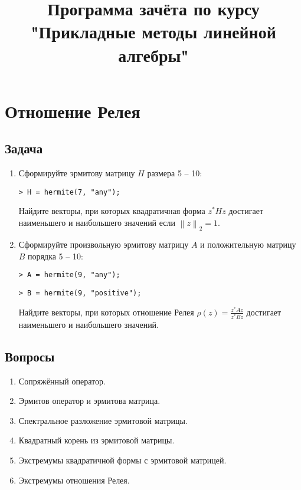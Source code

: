 \documentclass[a4paper,12pt]{article}
\newenvironment{Matlab}{\par \vspace{0.2cm}}{\vspace{0.2cm} \par}
\newcommand{\Mcommand}[1]{\noindent \texttt{> #1} \par}
\newcommand{\matlab}[1]{\begin{Matlab} \Mcommand{#1} \end{Matlab}}
\newcommand{\snorm}[1]{\left\| #1 \right\|_2}
\begin{document}
\title{Программа зачёта по курсу \\ "Прикладные методы линейной алгебры"}
\date{}
\author{}
\maketitle

\section{Отношение Релея}

\subsection{Задача}

\begin{enumerate}
    \item Сформируйте эрмитову матрицу $H$ размера 5 -- 10:
          \matlab{H = hermite(7, "any");}
          Найдите векторы, при которых квадратичная форма $z^* H z$ достигает наименьшего и наибольшего значений если $\snorm{z}=1$.

    \item Сформируйте произвольную эрмитову матрицу $A$ и положительную матрицу $B$ порядка 5 -- 10:
          \begin{Matlab}
              \Mcommand{A = hermite(9, "any");}
              \Mcommand{B = hermite(9, "positive");}
          \end{Matlab}
          Найдите векторы, при которых отношение Релея $\rho(z) = \frac{z^* A z}{z^* B z}$ достигает наименьшего и наибольшего значений.
\end{enumerate}

\subsection{Вопросы}

\begin{enumerate}
    \item Сопряжённый оператор.
    \item Эрмитов оператор и эрмитова матрица.
    \item Спектральное разложение эрмитовой матрицы.
    \item Квадратный корень из эрмитовой матрицы.
    \item Экстремумы квадратичной формы с эрмитовой матрицей.
    \item Экстремумы отношения Релея.
\end{enumerate}
\end{document}
